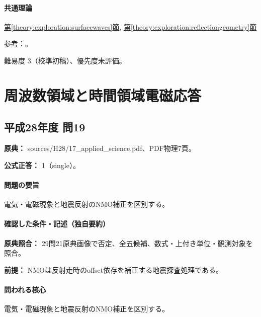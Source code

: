 \paragraph{共通理論} \hyperref[theory:exploration:surfacewaves]{第\ref*{theory:exploration:surfacewaves}節}, \hyperref[theory:exploration:reflectiongeometry]{第\ref*{theory:exploration:reflectiongeometry}節}

\par 参考：\cite{moe_surface2004,epa_surfacewaves,segj_integrated2017,epa_seismic_reflection}。

\par 難易度 3（校準初稿）、優先度未評価。

\section{周波数領域と時間領域電磁応答}

\subsection{平成28年度 問19}
\label{q:h28-reg-applied-19}

\noindent\textbf{原典：} sources/H28/17\_applied\_science.pdf、PDF物理7頁。

\textbf{公式正答：} 1（single）。

\paragraph{問題の要旨} 電気・電磁現象と地震反射のNMO補正を区別する。

\paragraph{確認した条件・記述（独自要約）}\mbox{}\par

\noindent\textbf{原典照合：} 29問21原典画像で否定、全五候補、数式・上付き単位・観測対象を照合。\par

\noindent\textbf{前提：} NMOは反射走時のoffset依存を補正する地震探査処理である。\par

\paragraph{問われる核心} 電気・電磁現象と地震反射のNMO補正を区別する。

